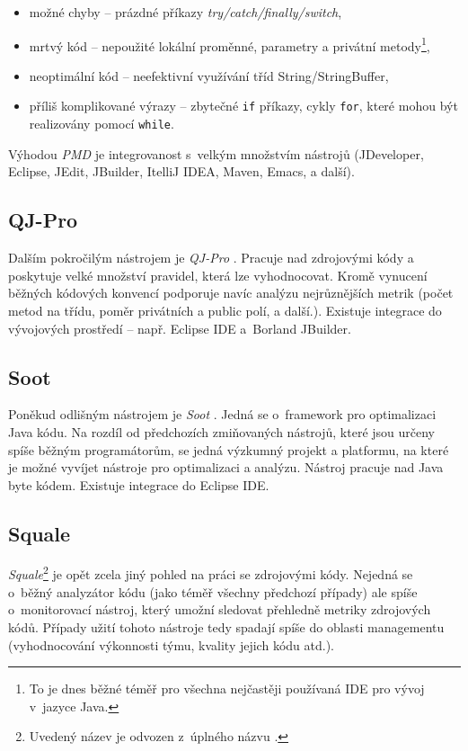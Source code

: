 \begin{itemize}
\item možné chyby -- prázdné příkazy \emph{try/catch/finally/switch},
\item mrtvý kód -- nepoužité lokální proměnné, parametry a privátní metody\footnote{To je dnes běžné téměř pro všechna nejčastěji používaná IDE pro vývoj v~jazyce Java.},
\item neoptimální kód -- neefektivní využívání tříd String/StringBuffer,
\item příliš komplikované výrazy -- zbytečné \verb+if+ příkazy, cykly \verb+for+, které mohou být realizovány pomocí \verb+while+.
\end{itemize}

Výhodou \emph{PMD} je integrovanost s~velkým množstvím nástrojů (JDeveloper, Eclipse, JEdit, JBuilder, ItelliJ IDEA, Maven, Emacs, a další).

\subsection{QJ-Pro}
Dalším pokročilým nástrojem je \emph{QJ-Pro} \cite{existingtools:qjpro}. Pracuje nad zdrojovými kódy a poskytuje velké množství pravidel, která lze vyhodnocovat. Kromě vynucení běžných kódových konvencí podporuje navíc analýzu nejrůznějších metrik (počet metod na třídu, poměr privátních a public polí, a další.). Existuje integrace do vývojových prostředí -- např. Eclipse IDE a~Borland JBuilder.

\subsection{Soot}
Poněkud odlišným nástrojem je \emph{Soot} \cite{existingtools:soot}. Jedná se o~framework pro optimalizaci Java kódu. Na rozdíl od předchozích zmiňovaných nástrojů, které jsou určeny spíše běžným programátorům, se jedná výzkumný projekt a platformu, na které je možné vyvíjet nástroje pro optimalizaci a analýzu. Nástroj pracuje nad Java byte kódem. Existuje integrace do Eclipse IDE.

\subsection{Squale}
\emph{Squale}\footnote{Uvedený název je odvozen z~úplného názvu .} \cite{existingtools:squale} je opět zcela jiný pohled na práci se zdrojovými kódy. Nejedná se o~běžný analyzátor kódu (jako téměř všechny předchozí případy) ale spíše o~monitorovací nástroj, který umožní sledovat přehledně metriky zdrojových kódů. Případy užití tohoto nástroje tedy spadají spíše do oblasti managementu (vyhodnocování výkonnosti týmu, kvality jejich kódu atd.).
